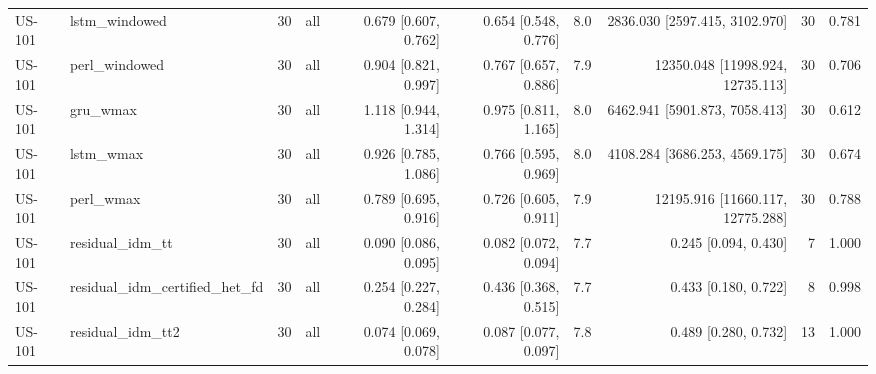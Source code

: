 \begin{table}[htbp]
{\begin{tabular}{llrlrrrrrr}
US-101 & lstm\_windowed & 30 & all & 0.679 [0.607, 0.762] & 0.654 [0.548, 0.776] & 8.0 & 2836.030 [2597.415, 3102.970] & 30 & 0.781 \\
US-101 & perl\_windowed & 30 & all & 0.904 [0.821, 0.997] & 0.767 [0.657, 0.886] & 7.9 & 12350.048 [11998.924, 12735.113] & 30 & 0.706 \\
US-101 & gru\_wmax & 30 & all & 1.118 [0.944, 1.314] & 0.975 [0.811, 1.165] & 8.0 & 6462.941 [5901.873, 7058.413] & 30 & 0.612 \\
US-101 & lstm\_wmax & 30 & all & 0.926 [0.785, 1.086] & 0.766 [0.595, 0.969] & 8.0 & 4108.284 [3686.253, 4569.175] & 30 & 0.674 \\
US-101 & perl\_wmax & 30 & all & 0.789 [0.695, 0.916] & 0.726 [0.605, 0.911] & 7.9 & 12195.916 [11660.117, 12775.288] & 30 & 0.788 \\
US-101 & residual\_idm\_tt & 30 & all & 0.090 [0.086, 0.095] & 0.082 [0.072, 0.094] & 7.7 & 0.245 [0.094, 0.430] & 7 & 1.000 \\
US-101 & residual\_idm\_certified\_het\_fd & 30 & all & 0.254 [0.227, 0.284] & 0.436 [0.368, 0.515] & 7.7 & 0.433 [0.180, 0.722] & 8 & 0.998 \\
US-101 & residual\_idm\_tt2 & 30 & all & 0.074 [0.069, 0.078] & 0.087 [0.077, 0.097] & 7.8 & 0.489 [0.280, 0.732] & 13 & 1.000 \\
\bottomrule
\end{tabular}
}
\end{table}
